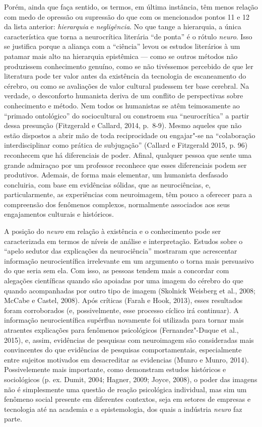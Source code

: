 Porém, ainda que faça sentido, os termos, em última instância, têm menos
relação com medo de opressão ou supressão do que com os mencionados
pontos 11 e 12 da lista anterior: \emph{hierarquia} e
\emph{negligência}. No que tange a hierarquia, a única característica
que torna a neurocrítica literária ``de ponta'' é o rótulo \emph{neuro}.
Isso se justifica porque a aliança com a ``ciência'' levou os estudos
literários à um patamar mais alto na hierarquia epistêmica --- como se
outros métodos não produzissem conhecimento genuíno, como se não
tivéssemos percebido de que ler literatura pode ter valor antes da
existência da tecnologia de escaneamento do cérebro, ou como se
avaliações de valor cultural pudessem ter base cerebral. Na verdade, o
desconforto humanista deriva de um conflito de perspectivas sobre
conhecimento e método. Nem todos os humanistas se atêm teimosamente ao
``primado ontológico'' do sociocultural ou constroem sua
``neurocrítica'' a partir dessa presunção (Fitzgerald e Callard, 2014,
p.~8-9). Mesmo aqueles que não estão dispostos a abrir mão de toda
reciprocidade ou engajar"-se na ``colaboração interdisciplinar como
prática de subjugação'' (Callard e Fitzgerald 2015, p. 96) reconhecem
que há diferenciais de poder. Afinal, qualquer pessoa que sente uma
grande admiraçao por um professor reconhece que esses diferenciais podem
ser produtivos. Ademais, de forma mais elementar, um humanista desfasado
concluiria, com base em evidências sólidas, que as neurociências, e,
particularmente, as experiências com neuroimagem, têm pouco a oferecer
para a compreensão dos fenômenos complexos, normalmente associados aos
seus engajamentos culturais e históricos.

A posição do \emph{neuro} em relação à existência e o conhecimento pode
ser caracterizada em termos de níveis de análise e interpretação.
Estudos sobre o ``apelo sedutor das explicações da neurociência''
mostraram que acrescentar informação neurocientífica irrelevante em um
argumento o torna mais persuasivo do que seria sem ela. Com isso, as
pessoas tendem mais a concordar com alegações científicas quando são
apoiadas por uma imagem do cérebro do que quando acompanhadas por outro
tipo de imagem (Skolnick Weisberg et al., 2008; McCabe e Castel, 2008).
Após críticas (Farah e Hook, 2013), esses resultados foram corroborados
(e, possivelmente, esse processo cíclico irá continuar). A informação
neurocientífica supérflua novamente foi utilizada para tornar mais
atraentes explicações para fenômenos psicológicos (Fernandez"-Duque et
al., 2015), e, assim, evidências de pesquisas com neuroimagem são
consideradas mais convincentes do que evidências de pesquisas
comportamentais, especialmente entre sujeitos motivados em desacreditar
as evidencias (Munro e Munro, 2014). Possivelemente mais importante,
como demonstram estudos históricos e sociológicos (p. ex. Dumit, 2004;
Hagner, 2009; Joyce, 2008), o poder das imagens não é simplesmente uma
questão de reação psicológica individual, mas sim um fenômeno social
presente em diferentes contextos, seja em setores de empresas e
tecnologia até na academia e a epistemologia, dos quais a indústria
\emph{neuro} faz parte.

